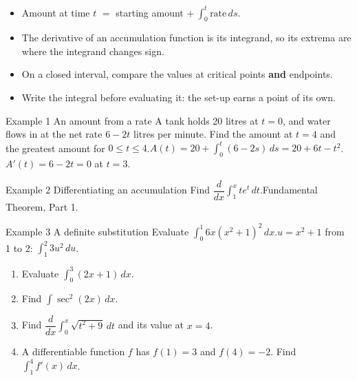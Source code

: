 \documentclass[11pt]{article}
\begin{document}

\begin{ideabox}
\begin{itemize}[leftmargin=*,itemsep=2pt,topsep=2pt]
  \item Amount at time $t$ $=$ starting amount $+\ \displaystyle\int_{0}^{t}\text{rate}\,ds$.
  \item The derivative of an accumulation function is its integrand, so its extrema are where the integrand changes sign.
  \item On a closed interval, compare the values at critical points \textbf{and} endpoints.
  \item Write the integral before evaluating it: the set-up earns a point of its own.
\end{itemize}
\end{ideabox}

\begin{example}{Example 1 \textperiodcentered{} An amount from a rate}
A tank holds 20 litres at $t=0$, and water flows in at the net rate $6-2t$ litres per minute. Find the amount at $t=4$ and the greatest amount for $0\le t\le4$.\soln $A(t)=20+\displaystyle\int_{0}^{t}(6-2s)\,ds=20+6t-t^2$. $A'(t)=6-2t=0$ at $t=3$.
\end{example}

\begin{example}{Example 2 \textperiodcentered{} Differentiating an accumulation}
Find $\dfrac{d}{dx}\displaystyle\int_{1}^{x}te^{t}\,dt$.\soln Fundamental Theorem, Part 1.
\end{example}

\begin{example}{Example 3 \textperiodcentered{} A definite substitution}
Evaluate $\displaystyle\int_{0}^{1}6x\left(x^2+1\right)^2\,dx$.\soln $u=x^2+1$ from 1 to 2: $\displaystyle\int_{1}^{2}3u^2\,du$.
\end{example}

\newpage
{}

\begin{enumerate}[leftmargin=*,itemsep=2pt]
  \item Evaluate $\displaystyle\int_{0}^{3}(2x+1)\,dx$.\work{2.3cm}
  \item Find $\displaystyle\int\sec^2(2x)\,dx$.\work{2.3cm}
  \item Find $\dfrac{d}{dx}\displaystyle\int_{0}^{x}\sqrt{t^2+9}\,dt$ and its value at $x=4$.\work{2.3cm}
  \item A differentiable function $f$ has $f(1)=3$ and $f(4)=-2$. Find $\displaystyle\int_{1}^{4}f'(x)\,dx$.\work{2.3cm}
\end{enumerate}
\end{document}
